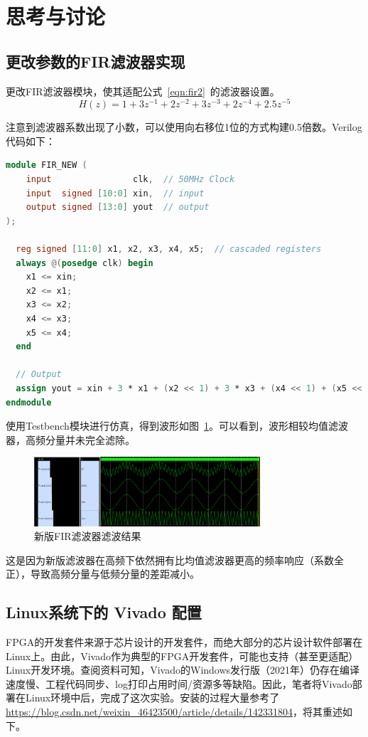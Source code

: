 \documentclass[lang=cn,newtx,10pt,scheme=chinese]{elegantbook}
\begin{document}
\section{思考与讨论}
\subsection{更改参数的FIR滤波器实现}
更改FIR滤波器模块，使其适配公式~\ref{eqn:fir2}~的滤波器设置。
\begin{equation}\label{eqn:fir2}
  H(z) = 1 + 3z^{-1} + 2z^{-2} + 3z^{-3} + 2z^{-4} + 2.5z^{-5}
\end{equation}

注意到滤波器系数出现了小数，可以使用向右移位1位的方式构建0.5倍数。Verilog代码如下：
\begin{lstlisting}[language=verilog,caption={新版滤波器模块}]
module FIR_NEW (
    input                clk,  // 50MHz Clock
    input  signed [10:0] xin,  // input
    output signed [13:0] yout  // output
);

  reg signed [11:0] x1, x2, x3, x4, x5;  // cascaded registers
  always @(posedge clk) begin
    x1 <= xin;
    x2 <= x1;
    x3 <= x2;
    x4 <= x3;
    x5 <= x4;
  end

  // Output
  assign yout = xin + 3 * x1 + (x2 << 1) + 3 * x3 + (x4 << 1) + (x5 << 1) + (x5 >> 1);
endmodule

\end{lstlisting}

使用Testbench模块进行仿真，得到波形如图~\ref{fig:exp4:result2}。可以看到，波形相较均值滤波器，高频分量并未完全滤除。
\begin{figure}[htbp]
  \centering
  \includegraphics[width=0.75\textwidth]{figure/exp4/vivado_waveform_2.png}
  \caption{新版FIR滤波器滤波结果}
  \label{fig:exp4:result2}
\end{figure}

这是因为新版滤波器在高频下依然拥有比均值滤波器更高的频率响应（系数全正），导致高频分量与低频分量的差距减小。
\subsection{Linux系统下的 Vivado 配置}
FPGA的开发套件来源于芯片设计的开发套件，而绝大部分的芯片设计软件部署在Linux上。由此，Vivado作为典型的FPGA开发套件，可能也支持（甚至更适配）Linux开发环境。查阅资料可知，Vivado的Windows发行版（2021年）仍存在编译速度慢、工程代码同步、log打印占用时间/资源多等缺陷。因此，笔者将Vivado部署在Linux环境中后，完成了这次实验。安装的过程大量参考了\url{https://blog.csdn.net/weixin_46423500/article/details/142331804}，将其重述如下。
\end{document}
